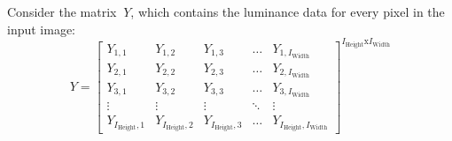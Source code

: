 \documentclass[12pt]{article}
\begin{document}
Consider the matrix \(\ Y \), which contains the luminance data for every pixel in the input image:
\begin{equation}
Y = \begin{bmatrix}
Y_{{1},{1}} & Y_{{1},{2}} & Y_{{1},{3}} & \dots & Y_{{1},{I_{\text{Width}}}} \\
Y_{{2},{1}} & Y_{{2},{2}} & Y_{{2},{3}} & \dots & Y_{{2},{I_{\text{Width}}}} \\
Y_{{3},{1}} & Y_{{3},{2}} & Y_{{3},{3}} & \dots & Y_{{3},{I_{\text{Width}}}} \\
\vdots & \vdots & \vdots & \ddots & \vdots \\
Y_{{I_{\text{Height}}},{1}} & Y_{{I_{\text{Height}}},{2}} & Y_{{I_{\text{Height}}},{3}} & \dots & Y_{{I_{\text{Height}}},{I_{\text{Width}}}}
\end{bmatrix} ^ {I_\text{Height}\text{x}I_\text{Width}}
\end{equation}
\end{document}
